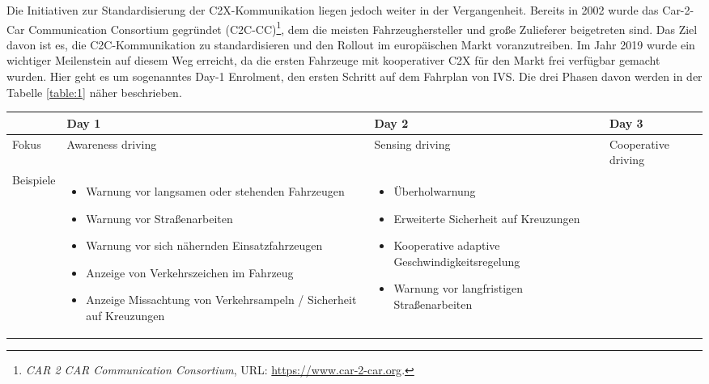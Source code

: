 Die Initiativen zur Standardisierung der C2X-Kommunikation liegen jedoch weiter in der Vergangenheit. Bereits in 2002 wurde das Car-2-Car Communication Consortium gegründet (C2C-CC)\footnote{\emph{CAR 2 CAR Communication Consortium}, URL: \url{https://www.car-2-car.org}.}\nocite{Car2Car}, dem die meisten Fahrzeughersteller und große Zulieferer beigetreten sind. Das Ziel davon ist es, die C2C-Kommunikation zu standardisieren und den Rollout im europäischen Markt voranzutreiben. Im Jahr 2019 wurde ein wichtiger Meilenstein auf diesem Weg erreicht, da die ersten Fahrzeuge mit kooperativer C2X für den Markt frei verfügbar gemacht wurden. Hier geht es um sogenanntes Day-1 Enrolment, den ersten Schritt auf dem Fahrplan von IVS. Die drei Phasen davon werden in der Tabelle \ref{table:1} näher beschrieben.

\begin{table}[h!]
	\centering
	\begin{tabular}{|m{4em}|m{10em}|m{10em}|m{8em}|} 
		\hline
		& Day 1 & Day 2 & Day 3 \\ [1ex]
		\hline
		Fokus & Awareness driving & Sensing driving & Cooperative driving \\ [1ex]
		\hline 
		Beispiele & \begin{itemize}[leftmargin=0.3cm] \item Warnung vor langsamen oder stehenden Fahrzeugen
		
		\item Warnung vor Straßenarbeiten
		
		\item Warnung vor sich nähernden Einsatzfahrzeugen
		
		\item Anzeige von Verkehrszeichen im Fahrzeug
		
		\item Anzeige Missachtung von Verkehrsampeln / Sicherheit auf Kreuzungen 
		
	\end{itemize} & 
	\begin{itemize}[leftmargin=0.3cm] \item Überholwarnung
	
	\item Erweiterte Sicherheit auf Kreuzungen 
	
	\item Kooperative adaptive Geschwindigkeitsregelung
	
	\item Warnung vor langfristigen Straßenarbeiten
	

\end{itemize}
\end{tabular}
\end{table}
